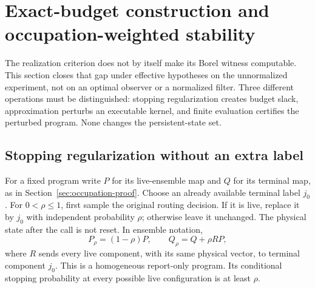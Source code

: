 \section{Exact-budget construction and occupation-weighted stability}\label{sec:effective}
The realization criterion does not by itself make its Borel witness computable. This section closes that gap under effective hypotheses on the unnormalized experiment, not on an optimal observer or a normalized filter. Three different operations must be distinguished: stopping regularization creates budget slack, approximation perturbs an executable kernel, and finite evaluation certifies the perturbed program. None changes the persistent-state set.

\subsection{Stopping regularization without an extra label}
For a fixed program write $P$ for its live-ensemble map and $Q$ for its terminal map, as in Section~\ref{sec:occupation-proof}. Choose an already available terminal label $j_0$. For $0<\rho\le1$, first sample the original routing decision. If it is live, replace it by $j_0$ with independent probability $\rho$; otherwise leave it unchanged. The physical state after the call is not reset. In ensemble notation,
\begin{equation}\label{eq:killed-routing}
 P_\rho=(1-\rho)P,\qquad Q_\rho=Q+\rho RP,
\end{equation}
where $R$ sends every live component, with its same physical vector, to terminal component $j_0$. This is a homogeneous report-only program. Its conditional stopping probability at every possible live configuration is at least $\rho$.

